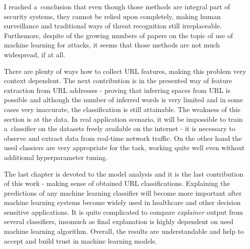 I reached a~conclusion that even though those methods are integral part of security systems, they cannot be relied upon completely, making human surveillance and traditional ways of threat recognition still irreplaceable.
Furthemore, despite of the growing numbers of  papers on the topic of use of machine learning for attacks, it seems that those methods are not much widespread, if at all.

There are plenty of ways how to collect URL features, making this problem very context dependent.
The next contribution is in the presented way of feature extraction from URL addresses - proving that inferring spaces from URL is possible and although the number of inferred words is very limited and in some cases very inaccurate, the classification is still attainable.
The weakness of this section is at the data.
In real application scenario, it will be impossible to train a~classifier on the datasets freely available on the internet - it is necessary to observe and extract data from real-time network traffic.
On the other hand the used classiers are very appropriate for the task, working quite well even without additional hyperparameter tuning.

The last chapter is devoted to the model analysis and it is the last contribution of this work - making sense of obtained URL classifications.
Explaining the predictions of any machine learning classifier will become more important after machine learning systems become widely used in healthcare and other decision sensitive applications.
It is quite complicated to compare \textit{explainer} output from several classifiers, insomuch as final explanation is highly dependent on used machine learning algorithm.
Overall, the results are understandable and help to accept and build trust in machine learning models.
